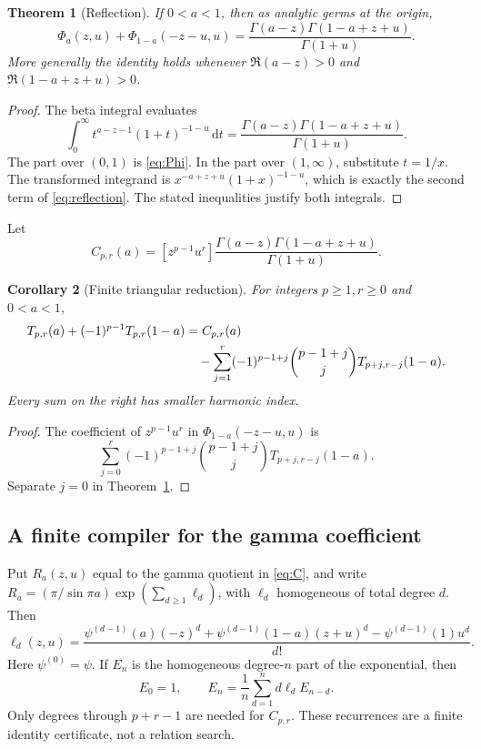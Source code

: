 \documentclass[11pt]{article}
\numberwithin{equation}{section}
\newtheorem{theorem}{Theorem}[section]
\newtheorem{corollary}[theorem]{Corollary}
\theoremstyle{definition}\newtheorem{definition}[theorem]{Definition}
\theoremstyle{remark}\newtheorem{remark}[theorem]{Remark}
\newcommand{\dd}{\,\mathrm d}
\begin{document}
\begin{theorem}[Reflection]\label{thm:reflection}
If $0<a<1$, then as analytic germs at the origin,
\begin{equation}\label{eq:reflection}
 \boxed{\quad
 \Phi_a(z,u)+\Phi_{1-a}(-z-u,u)
 =\frac{\Gamma(a-z)\Gamma(1-a+z+u)}{\Gamma(1+u)}.
 \quad}
\end{equation}
More generally the identity holds whenever
$\Re(a-z)>0$ and $\Re(1-a+z+u)>0$.
\end{theorem}
\begin{proof}
The beta integral evaluates
\[
 \int_0^\infty t^{a-z-1}(1+t)^{-1-u}\dd t
 =\frac{\Gamma(a-z)\Gamma(1-a+z+u)}{\Gamma(1+u)}.
\]
The part over $(0,1)$ is \eqref{eq:Phi}. In the part over $(1,\infty)$, substitute $t=1/x$. The transformed integrand is
$x^{-a+z+u}(1+x)^{-1-u}$, which is exactly the second term of \eqref{eq:reflection}. The stated inequalities justify both integrals.
\end{proof}

Let
\begin{equation}\label{eq:C}
 C_{p,r}(a)=[z^{p-1}u^r]
 \frac{\Gamma(a-z)\Gamma(1-a+z+u)}{\Gamma(1+u)}.
\end{equation}

\begin{corollary}[Finite triangular reduction]\label{cor:triangular}
For integers $p\ge1,r\ge0$ and $0<a<1$,
\begin{align}\label{eq:triangular}
 T_{p,r}(a)+(-1)^{p-1}T_{p,r}(1-a)
 &=C_{p,r}(a)\\
 &\quad-\sum_{j=1}^r(-1)^{p-1+j}
   \binom{p-1+j}{j}T_{p+j,r-j}(1-a).\notag
\end{align}
Every sum on the right has smaller harmonic index.
\end{corollary}
\begin{proof}
The coefficient of $z^{p-1}u^r$ in
$\Phi_{1-a}(-z-u,u)$ is
\[
 \sum_{j=0}^r(-1)^{p-1+j}\binom{p-1+j}{j}
                       T_{p+j,r-j}(1-a).
\]
Separate $j=0$ in Theorem~\ref{thm:reflection}.
\end{proof}

\subsection{A finite compiler for the gamma coefficient}
Put $R_a(z,u)$ equal to the gamma quotient in \eqref{eq:C}, and write
$R_a=(\pi/\sin\pi a)\exp(\sum_{d\ge1}\ell_d)$, with $\ell_d$ homogeneous of total degree $d$. Then
\begin{equation}\label{eq:loggammaCoeff}
 \ell_d(z,u)=\frac{\psi^{(d-1)}(a)(-z)^d
       +\psi^{(d-1)}(1-a)(z+u)^d
       -\psi^{(d-1)}(1)u^d}{d!}.
\end{equation}
Here $\psi^{(0)}=\psi$. If $E_n$ is the homogeneous degree-$n$ part of the exponential, then
\begin{equation}\label{eq:expRec}
 E_0=1,\qquad E_n=\frac1n\sum_{d=1}^n d\ell_d E_{n-d}.
\end{equation}
Only degrees through $p+r-1$ are needed for $C_{p,r}$. These recurrences are a finite identity certificate, not a relation search.
\end{document}
